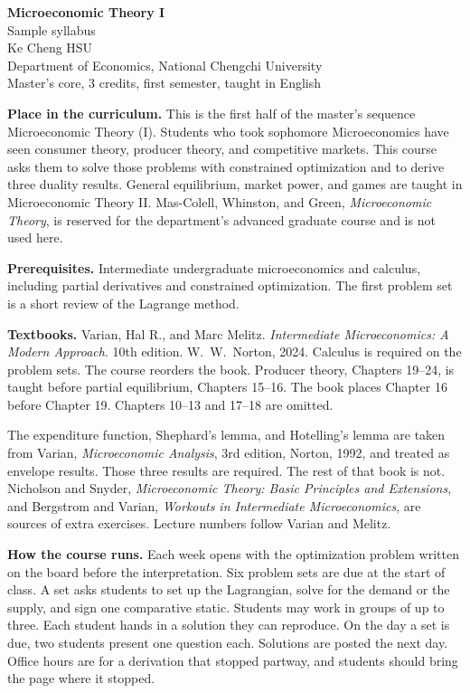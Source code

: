 \documentclass[11pt]{article}
\begin{document}
\begin{center}
{\Large\bfseries Microeconomic Theory I}\\[0.3em]
Sample syllabus\\[0.15em]
Ke Cheng HSU\\
Department of Economics, National Chengchi University\\
Master's core, 3 credits, first semester, taught in English
\end{center}

\textbf{Place in the curriculum.}
This is the first half of the master's sequence Microeconomic Theory (I). Students who took sophomore Microeconomics have seen consumer theory, producer theory, and competitive markets. This course asks them to solve those problems with constrained optimization and to derive three duality results. General equilibrium, market power, and games are taught in Microeconomic Theory II. Mas-Colell, Whinston, and Green, \emph{Microeconomic Theory}, is reserved for the department's advanced graduate course and is not used here.

\textbf{Prerequisites.}
Intermediate undergraduate microeconomics and calculus, including partial derivatives and constrained optimization. The first problem set is a short review of the Lagrange method.

\textbf{Textbooks.}
Varian, Hal R., and Marc Melitz. \emph{Intermediate Microeconomics: A Modern Approach}. 10th edition. W.\ W.\ Norton, 2024. Calculus is required on the problem sets. The course reorders the book. Producer theory, Chapters 19--24, is taught before partial equilibrium, Chapters 15--16. The book places Chapter 16 before Chapter 19. Chapters 10--13 and 17--18 are omitted.

The expenditure function, Shephard's lemma, and Hotelling's lemma are taken from Varian, \emph{Microeconomic Analysis}, 3rd edition, Norton, 1992, and treated as envelope results. Those three results are required. The rest of that book is not. Nicholson and Snyder, \emph{Microeconomic Theory: Basic Principles and Extensions}, and Bergstrom and Varian, \emph{Workouts in Intermediate Microeconomics}, are sources of extra exercises. Lecture numbers follow Varian and Melitz.

\textbf{How the course runs.}
Each week opens with the optimization problem written on the board before the interpretation. Six problem sets are due at the start of class. A set asks students to set up the Lagrangian, solve for the demand or the supply, and sign one comparative static. Students may work in groups of up to three. Each student hands in a solution they can reproduce. On the day a set is due, two students present one question each. Solutions are posted the next day. Office hours are for a derivation that stopped partway, and students should bring the page where it stopped.
\end{document}
